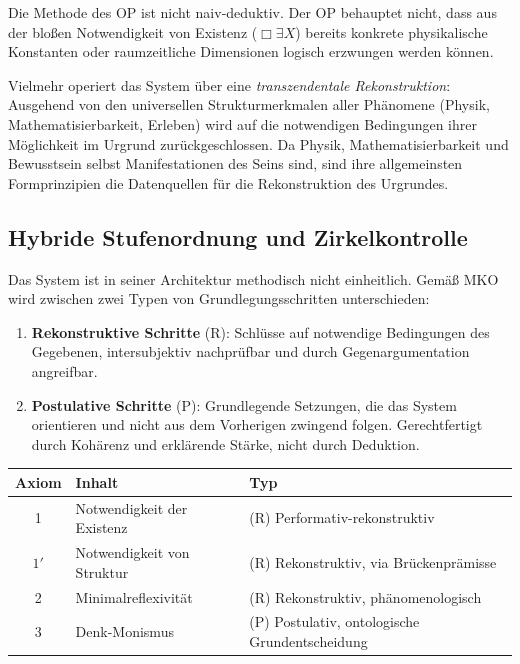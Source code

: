 \documentclass[11pt,a4paper]{article}
\theoremstyle{plain}
\theoremstyle{definition}
\begin{document}
Die Methode des OP ist nicht naiv-deduktiv. Der OP behauptet nicht, dass aus der
blo\ss{}en Notwendigkeit von Existenz ($\Box\exists X$) bereits konkrete physikalische
Konstanten oder raumzeitliche Dimensionen logisch erzwungen werden k\"{o}nnen.

Vielmehr operiert das System \"{u}ber eine \emph{transzendentale Rekonstruktion}: Ausgehend
von den universellen Strukturmerkmalen aller Ph\"{a}nomene (Physik, Mathematisierbarkeit,
Erleben) wird auf die notwendigen Bedingungen ihrer M\"{o}glichkeit im Urgrund
zur\"{u}ckgeschlossen. Da Physik, Mathematisierbarkeit und Bewusstsein selbst Manifestationen
des Seins sind, sind ihre allgemeinsten Formprinzipien die Datenquellen f\"{u}r die
Rekonstruktion des Urgrundes.

\subsection{Hybride Stufenordnung und Zirkelkontrolle}

Das System ist in seiner Architektur methodisch nicht einheitlich. Gem\"{a}\ss{} MKO
wird zwischen zwei Typen von Grundlegungsschritten unterschieden:

\begin{enumerate}[label=(\alph*)]
  \item \textbf{Rekonstruktive Schritte} (R): Schl\"{u}sse auf notwendige Bedingungen
        des Gegebenen, intersubjektiv nachpr\"{u}fbar und durch Gegenargumentation
        angreifbar.
  \item \textbf{Postulative Schritte} (P): Grundlegende Setzungen, die das System
        orientieren und nicht aus dem Vorherigen zwingend folgen. Gerechtfertigt durch
        Koh\"{a}renz und erkl\"{a}rende St\"{a}rke, nicht durch Deduktion.
\end{enumerate}

\begin{center}
\begin{tabular}{cll}
  \toprule
  \textbf{Axiom} & \textbf{Inhalt} & \textbf{Typ} \\
  \midrule
  1    & Notwendigkeit der Existenz   & (R) Performativ-rekonstruktiv \\
  $1'$ & Notwendigkeit von Struktur   & (R) Rekonstruktiv, via Br\"{u}ckenpr\"{a}misse \\
  2    & Minimalreflexivit\"{a}t      & (R) Rekonstruktiv, ph\"{a}nomenologisch \\
  3    & Denk-Monismus                & (P) Postulativ, ontologische Grundentscheidung \\
  \bottomrule
\end{tabular}
\end{center}
\end{document}

